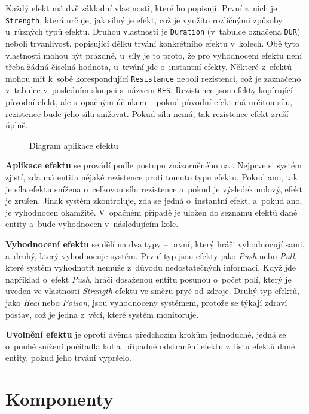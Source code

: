 Každý efekt má dvě základní vlastnosti, které ho popisují. První z~nich je \texttt{Strength}, která určuje, jak silný je efekt, což je využito rozličnými způsoby u~různých typů efektu. Druhou vlastností je \texttt{Duration} (v~tabulce označena \texttt{DUR}) neboli trvanlivost, popisující délku trvání konkrétního efektu v~kolech. Obě tyto vlastnosti mohou být prázdné, u~síly je to proto, že pro vyhodnocení efektu není třeba žádná číselná hodnota, u~trvání jde o~instantní efekty. Některé z~efektů mohou mít k~sobě korespondující \texttt{Resistance} neboli rezistenci, což je zaznačeno v~tabulce v~posledním sloupci s~názvem \texttt{RES}. Rezistence jsou efekty kopírující původní efekt, ale s~opačným účinkem -- pokud původní efekt má určitou sílu, rezistence bude jeho sílu snižovat. Pokud sílu nemá, tak rezistence efekt zruší úplně.

\begin{figure}[h]
    \centering
    \caption{Diagram aplikace efektu}
    \label{diag:apply_effect}
\end{figure}

\textbf{Aplikace efektu} se provádí podle postupu znázorněného na . Nejprve si systém zjistí, zda má entita nějaké rezistence proti tomuto typu efektu. Pokud ano, tak je síla efektu snížena o~celkovou sílu rezistence a~pokud je výsledek nulový, efekt je zrušen. Jinak systém zkontroluje, zda se jedná o~instantní efekt, a~pokud ano, je vyhodnocen okamžitě. V~opačném případě je uložen do seznamu efektů dané entity a~bude vyhodnocen v~následujícím kole.

\textbf{Vyhodnocení efektu} se dělí na dva typy -- první, který hráči vyhodnocují sami, a~druhý, který vyhodnocuje systém. První typ jsou efekty jako \textit{Push} nebo \textit{Pull}, které systém vyhodnotit nemůže z~důvodu nedostatečných informací. Když jde například o~efekt \textit{Push}, hráči dosaženou entitu posunou o~počet polí, který je uveden ve vlastnosti \textit{Strength} efektu ve směru pryč od zdroje. Druhý typ efektů, jako \textit{Heal} nebo \textit{Poison}, jsou vyhodnoceny systémem, protože se týkají zdraví postav, což je jedna z~věcí, které systém monitoruje.

\textbf{Uvolnění efektu} je oproti dvěma předchozím krokům jednoduché, jedná se o~pouhé snížení počítadla kol a~případné odstranění efektu z~listu efektů dané entity, pokud jeho trvání vypršelo.


\section{Komponenty}
\label{sec:design_components}

